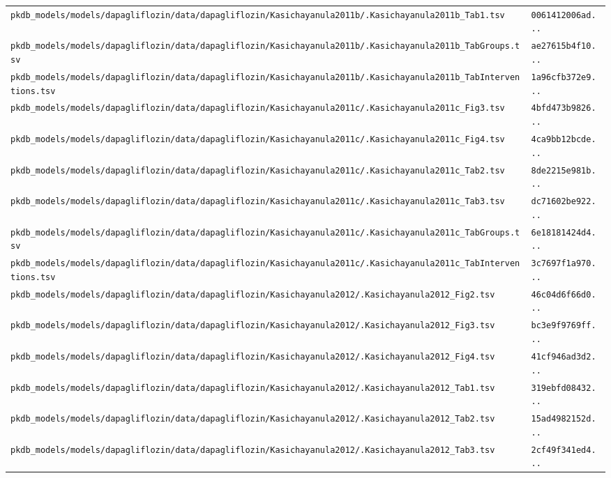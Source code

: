 \documentclass{article}
\begin{document}
\begin{longtable}{ll}
\texttt{pkdb\_models/models/dapagliflozin/data/dapagliflozin/Kasichayanula2011b/.Kasichayanula2011b\_Tab1.tsv} & \texttt{0061412006ad...} \\
\texttt{pkdb\_models/models/dapagliflozin/data/dapagliflozin/Kasichayanula2011b/.Kasichayanula2011b\_TabGroups.tsv} & \texttt{ae27615b4f10...} \\
\texttt{pkdb\_models/models/dapagliflozin/data/dapagliflozin/Kasichayanula2011b/.Kasichayanula2011b\_TabInterventions.tsv} & \texttt{1a96cfb372e9...} \\
\texttt{pkdb\_models/models/dapagliflozin/data/dapagliflozin/Kasichayanula2011c/.Kasichayanula2011c\_Fig3.tsv} & \texttt{4bfd473b9826...} \\
\texttt{pkdb\_models/models/dapagliflozin/data/dapagliflozin/Kasichayanula2011c/.Kasichayanula2011c\_Fig4.tsv} & \texttt{4ca9bb12bcde...} \\
\texttt{pkdb\_models/models/dapagliflozin/data/dapagliflozin/Kasichayanula2011c/.Kasichayanula2011c\_Tab2.tsv} & \texttt{8de2215e981b...} \\
\texttt{pkdb\_models/models/dapagliflozin/data/dapagliflozin/Kasichayanula2011c/.Kasichayanula2011c\_Tab3.tsv} & \texttt{dc71602be922...} \\
\texttt{pkdb\_models/models/dapagliflozin/data/dapagliflozin/Kasichayanula2011c/.Kasichayanula2011c\_TabGroups.tsv} & \texttt{6e18181424d4...} \\
\texttt{pkdb\_models/models/dapagliflozin/data/dapagliflozin/Kasichayanula2011c/.Kasichayanula2011c\_TabInterventions.tsv} & \texttt{3c7697f1a970...} \\
\texttt{pkdb\_models/models/dapagliflozin/data/dapagliflozin/Kasichayanula2012/.Kasichayanula2012\_Fig2.tsv} & \texttt{46c04d6f66d0...} \\
\texttt{pkdb\_models/models/dapagliflozin/data/dapagliflozin/Kasichayanula2012/.Kasichayanula2012\_Fig3.tsv} & \texttt{bc3e9f9769ff...} \\
\texttt{pkdb\_models/models/dapagliflozin/data/dapagliflozin/Kasichayanula2012/.Kasichayanula2012\_Fig4.tsv} & \texttt{41cf946ad3d2...} \\
\texttt{pkdb\_models/models/dapagliflozin/data/dapagliflozin/Kasichayanula2012/.Kasichayanula2012\_Tab1.tsv} & \texttt{319ebfd08432...} \\
\texttt{pkdb\_models/models/dapagliflozin/data/dapagliflozin/Kasichayanula2012/.Kasichayanula2012\_Tab2.tsv} & \texttt{15ad4982152d...} \\
\texttt{pkdb\_models/models/dapagliflozin/data/dapagliflozin/Kasichayanula2012/.Kasichayanula2012\_Tab3.tsv} & \texttt{2cf49f341ed4...} \\

\end{longtable}
\end{document}
